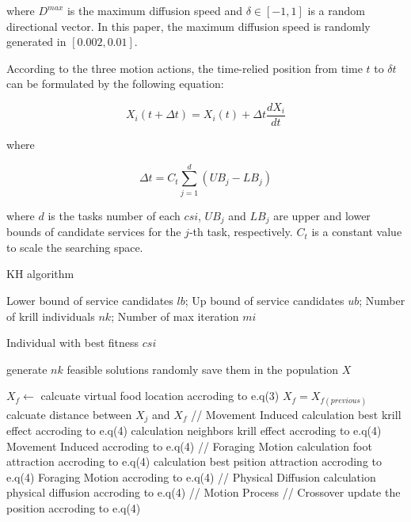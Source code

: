 \documentclass[10pt,journal,compsoc]{IEEEtran}
\begin{document}
where $D^{max}$ is the maximum diffusion speed and $\delta \in [-1, 1]$ is a random directional vector. In this paper, the maximum diffusion speed is randomly generated in $[0.002, 0.01]$. 

According to the three motion actions, the time-relied position from time $t$ to $\delta t$ can be formulated by the following equation:

\begin{equation}
X_i(t+\Delta t) = X_i(t) + \Delta t \frac{dX_i}{dt}
\end{equation}

where

\begin{equation}
\Delta t = C_t\sum_{j=1}^{d}(UB_j - LB_j)
\end{equation}

where $d$ is the tasks number of each $csi$, $UB_j$ and $LB_j$ are upper and lower bounds of candidate services for the $j$-th task, respectively. $C_t$ is a constant value to scale the searching space. 

\begin{algorithm}
\caption{KH algorithm}
\label{alg1}
\begin{algorithmic}

\REQUIRE Lower bound of service candidates $lb$; Up bound of service candidates $ub$; Number of krill individuals $nk$; Number of max iteration $mi$

\ENSURE Individual with best fitness $csi$

\STATE generate $nk$ feasible solutions randomly
\STATE save them in the population $X$

  \STATE $X_f \leftarrow$ calcuate virtual food location accroding to e.q(3)
    \STATE $X_f = X_{f(previous)}$
  \ENDIF
    \STATE calcuate distance between $X_j$ and $X_f$
    \STATE // Movement Induced
    \STATE calculation best krill effect accroding to e.q(4)
    \STATE calculation neighbors krill effect accroding to e.q(4)
    \STATE Movement Induced accroding to e.q(4)
    \STATE // Foraging Motion
    \STATE calculation foot attraction accroding to e.q(4)
    \STATE calculation best psition attraction accroding to e.q(4)
    \STATE Foraging Motion accroding to e.q(4)
    \STATE // Physical Diffusion
    \STATE calculation physical diffusion accroding to e.q(4)
    \STATE // Motion Process
    \STATE // Crossover
    \STATE update the position accroding to e.q(4)
  \ENDFOR 
\ENDFOR

\end{algorithmic}
\end{algorithm}
\end{document}
